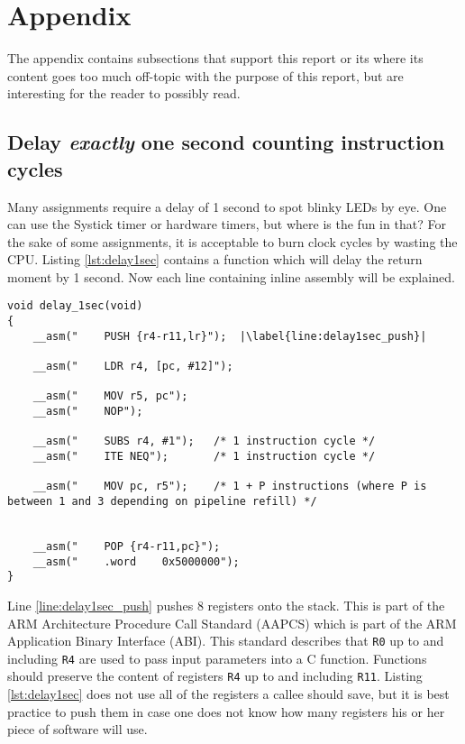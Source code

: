 \section{Appendix}

The appendix contains subsections that support this report or its where its content goes too much off-topic with the purpose of 
this report, but are interesting for the reader to possibly read.

\subsection{Delay \textit{exactly} one second counting instruction cycles}

Many assignments require a delay of 1 second to spot blinky LEDs by eye.
One can use the Systick timer or hardware timers, but where is the fun in that?
For the sake of some assignments, it is acceptable to burn clock cycles by wasting the CPU.
Listing \ref{lst:delay1sec} contains a function which will delay the return moment by 1 second.
Now each line containing inline assembly will be explained.

\begin{lstlisting}[style=CStyle, caption={C function containing inline assembly to perform a delay of \textit{exactly} one second}, captionpos=b, label={lst:delay1sec}, escapechar=|]
void delay_1sec(void)
{
    __asm("    PUSH {r4-r11,lr}");  |\label{line:delay1sec_push}|
 
    __asm("    LDR r4, [pc, #12]");
   
    __asm("    MOV r5, pc");
    __asm("    NOP");
     
    __asm("    SUBS r4, #1");   /* 1 instruction cycle */
    __asm("    ITE NEQ");       /* 1 instruction cycle */
   
    __asm("    MOV pc, r5");    /* 1 + P instructions (where P is between 1 and 3 depending on pipeline refill) */
     
     
    __asm("    POP {r4-r11,pc}");
    __asm("    .word    0x5000000");
}
\end{lstlisting}

Line \ref{line:delay1sec_push} pushes 8 registers onto the stack. 
This is part of the ARM Architecture Procedure Call Standard (AAPCS) which is part of the ARM Application Binary Interface (ABI). \cite{IntroEmbeddedSystems}
This standard describes that \texttt{R0} up to and including \texttt{R4} are used to pass input parameters into a C function. 
Functions should preserve the content of registers \texttt{R4} up to and including \texttt{R11}.
Listing \ref{lst:delay1sec} does not use all of the registers a callee should save, but it is best practice to push them in case one does not know how many registers his or her piece of software will use.

